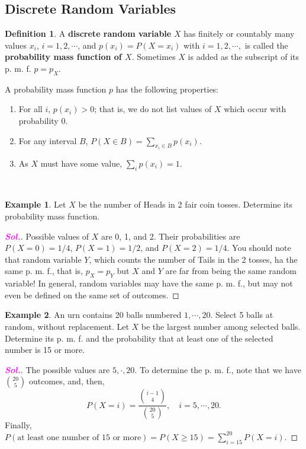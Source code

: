 \documentclass[12pt,a4paper]{article}
\theoremstyle{definition}
\newtheorem{example}{Example}[section]
\theoremstyle{definition}
\newtheorem*{definition}{Definition}
\theoremstyle{definition}
\theoremstyle{definition}
\theoremstyle{remark}
\theoremstyle{definition}
\newcommand{\sol}{\textcolor{magenta}{\bf \textit{Sol.}}\quad}
\begin{document}
\subsection{Discrete Random Variables}
\begin{tcolorbox}[colback=white]
	\begin{definition}
		A \textbf{discrete random variable} $X$ has finitely or countably many values $x_i$, $i=1,2,\cdots$, and $p(x_i)=P(X=x_i)$ with $i=1,2,\cdots,$ is called the \textbf{probability mass function of $X$}. Sometimes $X$ is added as the subscript of its p. m. f. $p=p_X$.
	\end{definition}
\end{tcolorbox} A probability mass function $p$ has the following properties:\begin{enumerate}
\item For all $i$, $p(x_i)>0$; that is, we do not list values of $X$ which occur with probability $0$.
\item For any interval $B$, $P(X\in B)=\sum_{x_i\in B}p(x_i)$.
\item As $X$ must have some value, $\sum_ip(x_i)=1$.
\end{enumerate}
\
\begin{example}
	Let $X$ be the number of Heads in 2 fair coin tosses. Determine its probability mass function. \begin{proof}[\sol]
		Possible values of $X$ are 0, 1, and 2. Their probabilities are $P(X=0)=1/4$, $P(X=1)=1/2$, and $P(X=2)=1/4$. You should note that random variable $Y$, which counts the number of Tails in the 2 tosses, ha the same p. m. f., that is, $p_X=p_Y$ but $X$ and $Y$ are far from being the same random variable! In general, random variables may have the same p. m. f., but may not even be defined on the same set of outcomes.
	\end{proof}
\end{example}
\newpage
\begin{example}
	An urn contains 20 balls numbered $1,\cdots,20$. Select 5 balls at random, without replacement. Let $X$ be the largest number among selected balls. Determine its p. m. f. and the probability that at least one of the selected number is 15 or more.\begin{proof}[\sol]
		The possible values are $5,\cdot,20$. To determine the p. m. f., note that we have $\binom{20}{5}$ outcomes, and, then, \[
		P(X=i)=\frac{\binom{i-1}{4}}{\binom{20}{5}},\quad i=5,\cdots,20.
		\] Finally, $P(\text{at least one number of 15 or more})=P(X\geq 15)=\sum_{i=15}^{20}P(X=i)$.
	\end{proof}
\end{example}
\end{document}
